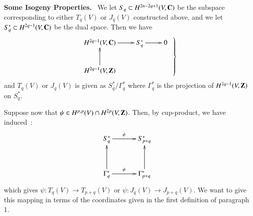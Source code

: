 \medskip
\noindent
{\bf Some Isogeny Properties.}~ We let $S_{q}\subset H^{2n-2q+1}(V,\mathbf{C})$ be the subspace corresponding to either $T_{q}(V)$ or $J_{q}(V)$ constructed above, and we let $S^{*}_{q}\subset H^{2q-1}(V,\mathbf{C})$ be the dual space. Then we have 
\[
\left.
\begin{array}{c}
\xymatrix{
H^{2q-1}(V,\bfC)\ar[r] & S^{*}_{q}\ar[r] & 0\\
H^{2q-1}(V,\bfZ)\ar[u] & &}
\end{array}\right\}
\]\pageoriginale
and $T_{q}(V)$ or $J_{q}(V)$ is given as $S^{*}_{q}/\Gamma^{*}_{q}$ where $\Gamma^{*}_{q}$ is the projection of $H^{2q-1}(V,\mathbf{Z})$ on $S^{*}_{q}$.

Suppose now that $\psi\in H^{p,p}(V)\cap H^{2p}(V,\mathbf{Z})$. Then, by cup-product, we have induced~:
\begin{equation}
\vcenter{
\xymatrix@=1.2cm{
S^{*}_{q}\ar[r]^-{\psi} & S^{*}_{p+q}\\
\Gamma^{*}_{q}\ar[r]^-{\psi}\ar[u] & \Gamma^{*}_{p+q}\ar[u]
}}\label{art08-sec2-eq2.7}
\end{equation}
which gives $\psi:T_{q}(V)\to T_{p+q}(V)$ or $\psi:J_{q}(V)\to J_{p+q}(V)$. We want to give this mapping in terms of the coordinates given in the first definition of paragraph 1.

